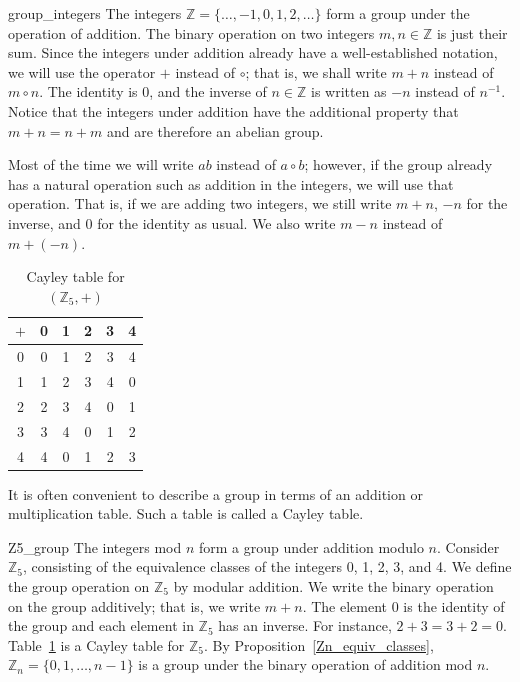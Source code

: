 \begin{example}{group_integers}
The integers ${\mathbb Z } = \{ \ldots , -1, 0, 1, 2, \ldots \}$ form a group under the operation of addition.  The binary operation on two integers $m, n \in {\mathbb Z}$ is just their sum.  Since the integers under addition already have a well-established notation, we will use the operator $+$ instead of $\circ$; that is, we shall write $m + n$ instead of $m \circ n$.  The identity is 0, and the inverse of $n \in {\mathbb Z}$ is written as $-n$ instead of $n^{-1}$.  Notice that the integers under addition have the additional property that $m + n = n + m$ and are therefore an abelian group.   
\end{example}

Most of the time we will write $ab$ instead of $a \circ b$; however, if the group already has a natural operation such as addition in the integers, we will use that operation.  That is, if we are adding two integers, we still write $m + n$, $-n$ for the inverse, and 0 for the identity as usual. We also write $m - n$ instead of $m + (-n)$.

\begin{table}[htb]
\caption{Cayley table for $({\mathbb Z}_5, +)$}{\small
\begin{center}
\begin{tabular}{c|ccccc}
$+$ & 0 & 1 & 2 & 3 & 4 \\
\hline
  0 & 0 & 1 & 2 & 3 & 4 \\
  1 & 1 & 2 & 3 & 4 & 0 \\
  2 & 2 & 3 & 4 & 0 & 1 \\
  3 & 3 & 4 & 0 & 1 & 2 \\
  4 & 4 & 0 & 1 & 2 & 3
\end{tabular}
\end{center}\label{Z5_Cayley_Table}
}
\end{table}
 
It is often convenient to describe a group in terms of an addition or multiplication table.  Such a table is called a {\bfi Cayley table}.

\medskip
 
\begin{example}{Z5_group}
The integers mod $n$ form a group under addition modulo $n$.  Consider ${\mathbb Z}_5$, consisting of the equivalence classes of the integers 0, 1, 2, 3, and 4.  We define the group operation on ${\mathbb Z}_5$ by modular addition.  We write the binary operation on the group additively; that is, we write $m + n$.  The element 0 is the identity of the group and each element in ${\mathbb Z}_5$ has an inverse. For instance, $2 + 3 = 3 + 2 = 0$.  Table~\ref{Z5_Cayley_Table} is a Cayley table for ${\mathbb Z}_5$.  By Proposition~\ref{Zn_equiv_classes}, ${\mathbb Z}_n = \{0, 1, \ldots, n-1 \}$ is a group under the binary operation of addition mod $n$.  
\end{example}

